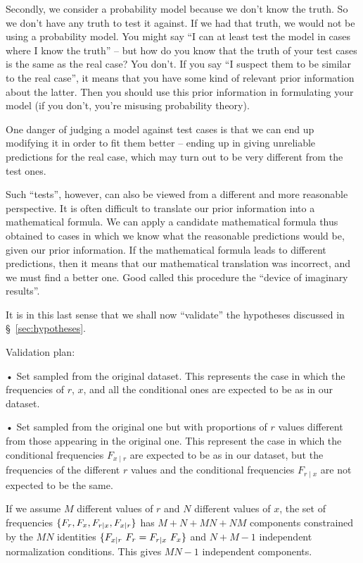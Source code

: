 \documentclass[\ifafour a4paper,12pt,\else a5paper,10pt,\fi%
onecolumn,oneside,article,%
british%
]{memoir}
\makeatletter
\theoremstyle{remark}
\theoremstyle{innote}
\newcommand*{\citey}{\parencites*}
\DeclarePairedDelimiter\set{\{}{\}}%
\renewcommand*{\|}[1][]{\nonscript\:#1\vert\nonscript\:\mathopen{}}
\renewcommand*{\=}{\TextOrMath\texteq\eq}
\newcommand*{\sect}{\S}%
\newcommand*{\wrench}{{\fontencoding{U}\fontfamily{fontawesomethree}\selectfont\symbol{114}}}
\newcommand{\mynote}[1]{ {\color{notecolour}#1}}
\newcommand*{\q}{}%
\DeclareRobustCommand*{\q}{%
  \mathord{\mathpalette\bigcdot@{}}%
}
\newcommand*{\bigcdot@scalefactor}{0.7}
\newcommand*{\bigcdot@widthfactor}{1.5}
\newcommand*{\bigcdot@}[2]{%
  \sbox0{$#1\vcenter{}$}%
  \sbox2{$#1\cdot\m@th$}%
  \hbox to \bigcdot@widthfactor\wd2{%
    \hfil
    \raise\ht0\hbox{%
      \scalebox{\bigcdot@scalefactor}{%
        \lower\ht0\hbox{$#1\bullet\m@th$}%
      }%
    }%
    \hfil
  }%
}
\makeatother
\begin{document}
Secondly, we consider a probability model because we don't know the truth.
So we don't have any truth to test it against. If we had that truth, we
would not be using a probability model. You might say \enquote{I can at
  least test the model in cases where I know the truth} -- but how do you
know that the truth of your test cases is the same as the real case? You
don't. If you say \enquote{I suspect them to be similar to the real case},
it means that you have some kind of relevant prior information about the
latter. Then you should use this prior information in formulating your
model (if you don't, you're misusing probability theory).

One danger of judging a model against test cases is that we can end up
modifying it in order to fit them better -- ending up in giving unreliable
predictions for the real case, which may turn out to be very different from
the test ones. %


Such \enquote{tests}, however, can also be viewed from a different and more
reasonable perspective. It is often difficult to translate our prior
information into a mathematical formula. We can apply a candidate
mathematical formula thus obtained to cases in which we know what the
reasonable predictions would be, given our prior information. If the
mathematical formula leads to different predictions, then it means that our
mathematical translation was incorrect, and we must find a better one. Good
\citey[\sect~4.3 p.~35]{good1950} called this procedure the \enquote{device
  of imaginary results}.

It is in this last sense that we shall now \enquote{validate} the
hypotheses discussed in \sect~\ref{sec:hypotheses}.

\medskip

\mynote{\wrench Validation plan:

  • Set sampled from the original dataset. This represents the case in
  which the frequencies of $r$, $x$, and all the conditional ones are
  expected to be as in our dataset.

  • Set sampled from the original one but with proportions of $r$ values
  different from those appearing in the original one. This represent the
  case in which the conditional frequencies $F_{x\mid r}$ are expected to
  be as in our dataset, but the frequencies of the different $r$ values and
  the conditional frequencies $F_{r\mid x}$ are not expected to be the
  same.


  If we assume $M$ different values of $r$ and $N$ different values of $x$,
  the set of frequencies
  $\set{F_{r\q}, F_{\q x}, F_{r\mid x}, F_{x\mid r}}$ has $M+N+M N + N M$
  components constrained by the $M N$ identities
  $\set{F_{x\mid r}\ F_{r\q} = F_{r\mid x}\ F_{\q x}}$ and $N + M -1$
  independent normalization conditions. This gives $M N - 1$ independent
  components.

}
\end{document}
